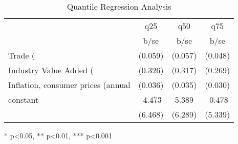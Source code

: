 \begin{table}[htbp]\centering\caption{Quantile Regression Analysis}\label{tab:qreg}\begin{tabular}{lccc}
                    &         q25   &         q50   &         q75   \\
                    &        b/se   &        b/se   &        b/se   \\
Trade (%
                    &     (0.059)   &     (0.057)   &     (0.048)   \\
Industry Value Added (%
                    &     (0.326)   &     (0.317)   &     (0.269)   \\
Inflation, consumer prices (annual %
                    &     (0.036)   &     (0.035)   &     (0.030)   \\
constant            &      -4.473   &       5.389   &      -0.478   \\
                    &     (6.468)   &     (6.289)   &     (5.339)   \\
\end{tabular}\end{table}
* p<0.05, ** p<0.01, *** p<0.001
